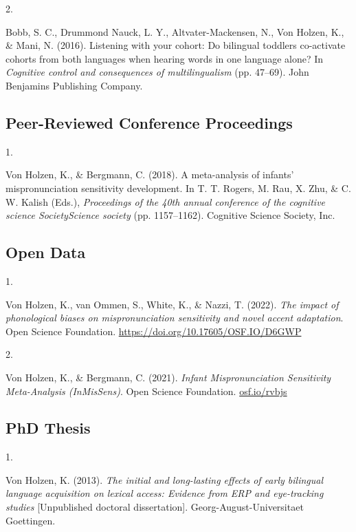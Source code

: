 \documentclass[10pt,a4paper,]{article}
\newlength{\cslhangindent}
\newlength{\csllabelwidth}
\newcommand{\CSLLeftMargin}[1]{\parbox[t]{\csllabelwidth}{\hfill #1~}}
\newcommand{\CSLRightInline}[1]{\parbox[t]{\linewidth - \cslhangindent - \csllabelwidth}{#1}\vspace{0.8ex}}
\begin{document}
\leavevmode{}%
\CSLLeftMargin{2. }%
\CSLRightInline{Bobb, S. C., Drummond Nauck, L. Y., Altvater-Mackensen,
N., Von Holzen, K., \& Mani, N. (2016). Listening with your cohort: Do
bilingual toddlers co-activate cohorts from both languages when hearing
words in one language alone? In \emph{Cognitive control and consequences
of multilingualism} (pp. 47--69). John Benjamins Publishing Company.}

\hypertarget{peer-reviewed-conference-proceedings}{%
\subsection{Peer-Reviewed Conference
Proceedings}\label{peer-reviewed-conference-proceedings}}

\hypertarget{bibliography}{}
\leavevmode{}%
\CSLLeftMargin{1. }%
\CSLRightInline{Von Holzen, K., \& Bergmann, C. (2018). A meta-analysis
of infants' mispronunciation sensitivity development. In T. T. Rogers,
M. Rau, X. Zhu, \& C. W. Kalish (Eds.), \emph{Proceedings of the 40th
annual conference of the cognitive science SocietyScience society} (pp.
1157--1162). Cognitive Science Society, Inc.}

\hypertarget{open-data}{%
\subsection{Open Data}\label{open-data}}

\hypertarget{bibliography}{}
\leavevmode{}%
\CSLLeftMargin{1. }%
\CSLRightInline{Von Holzen, K., van Ommen, S., White, K., \& Nazzi, T.
(2022). \emph{The impact of phonological biases on mispronunciation
sensitivity and novel accent adaptation}. Open Science Foundation.
\url{https://doi.org/10.17605/OSF.IO/D6GWP}}

\leavevmode{}%
\CSLLeftMargin{2. }%
\CSLRightInline{Von Holzen, K., \& Bergmann, C. (2021). \emph{Infant
Mispronunciation Sensitivity Meta-Analysis (InMisSens)}. Open Science
Foundation. \href{https://osf.io/rvbjs}{osf.io/rvbjs}}

\hypertarget{phd-thesis}{%
\subsection{PhD Thesis}\label{phd-thesis}}

\hypertarget{bibliography}{}
\leavevmode{}%
\CSLLeftMargin{1. }%
\CSLRightInline{Von Holzen, K. (2013). \emph{The initial and
long-lasting effects of early bilingual language acquisition on lexical
access: Evidence from ERP and eye-tracking studies} {[}Unpublished
doctoral dissertation{]}. Georg-August-Universitaet Goettingen.}
\end{document}
